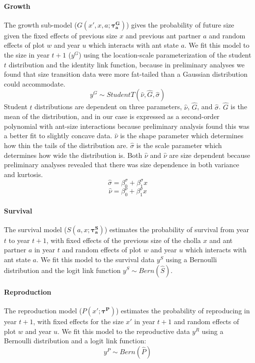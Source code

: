 \documentclass[11pt]{article}
\begin{document}
	\paragraph{Growth}
	The growth sub-model ($G(x',x,a;\pmb{\tau^G_{a}})$) gives the probability of future size given the fixed effects of previous size $x$ and previous ant partner $a$ and random effects of plot $w$ and year $u$ which interacts with ant state $a$. 
	We fit this model to the size in year $t+1$ ($y^G$) using the location-scale parameterization of the student $t$ distribution and the identity link function, because in preliminary analyses we found that size transition data were more fat-tailed than a Gaussian distribution could accommodate. 
	$$y^G \sim Student T(\hat{\nu},\hat{G},\hat{\sigma}) $$
	Student $t$ distributions are dependent on three parameters, $\hat{\nu}$,  $\hat{G}$, and $\hat{\sigma}$.
	$\hat{G}$ is the mean of the distribution, and in our case is expressed as a second-order polynomial with ant-size interactions because  preliminary analysis found this was a better fit to slightly concave data. 
	$\hat{\nu}$ is the shape parameter which determines how thin the tails of the distribution are.
	$\hat{\sigma}$ is the scale parameter which determines how wide the distribution is. 
	Both $\hat{\nu}$ and $\hat{\nu}$ are size dependent because preliminary analyses revealed that there was size dependence in both variance and kurtosis.
	$$\hat{\sigma} = \beta_{0}^{\sigma} + \beta_{1}^{\sigma}  x $$
	$$\hat{\nu} = \beta_{0}^{\nu} + \beta_{1}^{\nu}  x $$
	
	
	\paragraph{Survival}
	The survival model ($S(a,x;\pmb{\tau_{a}^{S}})$) estimates the probability of survival from year $t$ to year $t+1$, with fixed effects of the previous size of the cholla $x$ and ant partner $a$ in year $t$ and random effects of plot $w$ and year $u$ which interacts with ant state $a$.
	We fit this model to the survival data $y^S$  using a Bernoulli distribution and the logit link function
	$y^S \sim Bern(\hat{S})$.
	
	\paragraph{Reproduction}
	The reproduction model ($P(x';\pmb{\tau^{P}})$) estimates the probability of reproducing in year $t+1$, with fixed effects for the size $x'$ in year $t+1$ and random effects of plot $w$ and year $u$.
	We fit this model to the reproductive data $y^R$ using a Bernoulli distribution and a logit link function:
	$$y^P \sim Bern(\hat{P})$$
	
\end{document}
